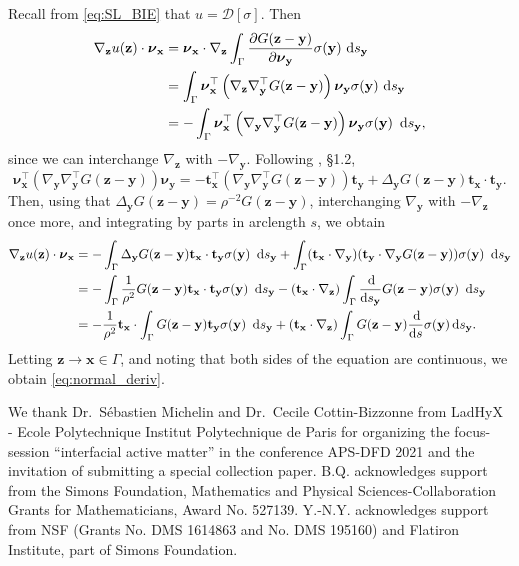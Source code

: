 \documentclass[prb,preprint,showpacs,preprintnumbers,amsmath,amssymb,longbibliography]{revtex4-1}
\newcommand{\nnu}{\boldsymbol{\nu}}
\newcommand{\xx}{\mathbf{x}}
\newcommand{\zz}{\mathbf{z}}
\newcommand{\yy}{\mathbf{y}}
\renewcommand{\tt}{\mathbf{t}}
\begin{document}
Recall from \eqref{eq:SL_BIE} that $u = \mathcal{D}[\sigma]$.
Then  
\begin{align*}
\nabla_{\zz} u(\zz) \cdot \nnu_{\xx}
&=\nnu_\xx \cdot \nabla_\zz \int_\Gamma \frac{\partial G(\zz-\yy)}{\partial \nnu_\yy}\sigma(\yy) \,\dif s_\yy\\
&=\int_\Gamma \nnu_\xx^\top \left(\nabla_\zz\nabla_\yy^\top  G(\zz-\yy)\right) \nnu_\yy\sigma(\yy)  \,\dif s_\yy\\
  &=-\int_\Gamma \nnu_\xx^\top \left(\nabla_\yy\nabla_\yy^\top G(\zz-\yy)\right)\nnu_\yy\sigma(\yy)\ \dif s_\yy,
\end{align*}
since we can interchange $\nabla_\zz$ with $-\nabla_\yy$.
Following \cite{Hsiao2008}, \S 1.2,
\[
\nnu_\xx^\top \left(\nabla_\yy\nabla_\yy^\top G(\zz-\yy)\right)\nnu_\yy
=
-\tt_{\xx}^\top \left(\nabla_\yy\nabla_\yy^\top G(\zz-\yy)\right)\tt_{\yy}
+ \Delta_{\yy}G(\zz-\yy) \tt_{\xx}\cdot \tt_{\yy}.
\]
Then, using that $\Delta_{\yy} G(\zz-\yy) = \rho^{-2} G(\zz-\yy)$,
interchanging $\nabla_\yy$ with $-\nabla_\zz$ once more,
and integrating by parts in arclength $s$,
we obtain 
\begin{align*}
\nabla_{\zz} u(\zz) \cdot \nnu_{\xx}
&=-\int_\Gamma  \Delta_\yy G(\zz-\yy) {\bf t}_\xx \cdot   {\bf t}_\yy \sigma(\yy)\ \dif s_\yy
+\int_\Gamma({\bf t}_\xx\cdot\nabla_\yy)({\bf t}_\yy\cdot\nabla_\yy G(\zz-\yy))\sigma(\yy)\ \dif s_\yy\\
&= -\int_\Gamma \frac{1}{\rho^{2}} G(\zz-\yy) {\bf t}_\xx \cdot {\bf t}_\yy \sigma(\yy)\ \dif s_\yy  
-({\bf t}_\xx\cdot\nabla_\zz)\int_\Gamma \frac{\dif}{\dif s_\yy}G(\zz-\yy) \sigma(\yy)\ \dif s_\yy\\
&= -\frac{1}{\rho^2} {\bf t}_\xx\cdot \int_\Gamma G(\zz-\yy){\bf t}_\yy \sigma(\yy)\ \dif s_\yy + 
({\bf t}_\xx \cdot \nabla_\zz)\int_\Gamma G(\zz-\yy)\frac{\dif }{\dif s} \sigma(\yy)  \dif s_\yy.
\end{align*}
%
Letting $\zz\to\xx\in\Gamma$, and noting that both sides of the equation are continuous,
we obtain \eqref{eq:normal_deriv}.


\begin{acknowledgments}
We thank Dr.~S\'ebastien Michelin and Dr.~Cecile Cottin-Bizzonne from LadHyX - Ecole Polytechnique Institut Polytechnique de Paris for organizing the focus-session ``interfacial active matter'' in the conference APS-DFD 2021 and the invitation of submitting a special collection paper. 
B.Q. acknowledges support from the Simons Foundation, Mathematics and Physical Sciences-Collaboration Grants for Mathematicians, Award No. 527139.
Y.-N.Y. acknowledges support from NSF (Grants No. DMS 1614863 and No. DMS 195160) and Flatiron Institute, part of Simons Foundation.

\end{acknowledgments}




\end{document}

